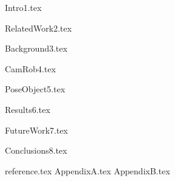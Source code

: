 \documentclass{ctuthesis}
\begin{document}
\maketitle


{Intro1.tex}

{RelatedWork2.tex}

{Background3.tex}


{CamRob4.tex}


{PoseObject5.tex}


{Results6.tex}


{FutureWork7.tex}

{Conclusions8.tex}



{reference.tex}
{AppendixA.tex}
{AppendixB.tex}
\end{document}
